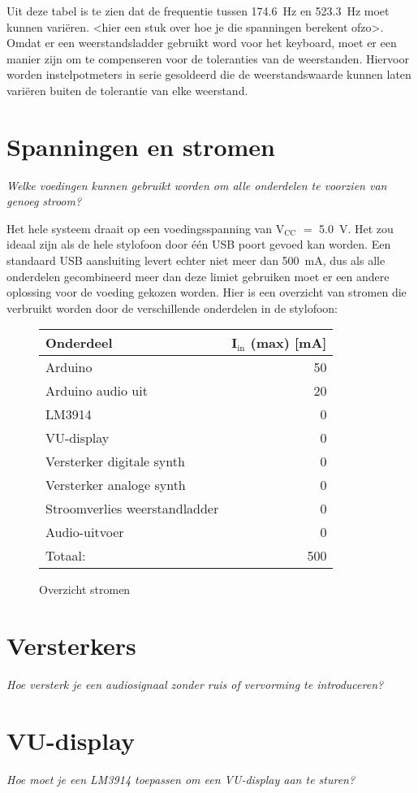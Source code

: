 \documentclass[12pt, a4paper, dutch]{article}
\newcommand{\sub}[1]{$_{\text{#1}}$}
\begin{document}
Uit deze tabel is te zien dat de frequentie tussen \SI{174.6}{\hertz} en
\SI{523.3}{\hertz} moet kunnen vari\"eren. <hier een stuk over hoe je die spanningen
berekent ofzo>. Omdat er een weerstandsladder gebruikt word voor het keyboard, moet
er een manier zijn om te compenseren voor de toleranties van de weerstanden. Hiervoor
worden instelpotmeters in serie gesoldeerd die de weerstandswaarde kunnen laten
vari\"eren buiten de tolerantie van elke weerstand.

\section{Spanningen en stromen}

\textit{Welke voedingen kunnen gebruikt worden om alle onderdelen te voorzien van
genoeg stroom?}

Het hele systeem draait op een voedingsspanning van V\sub{CC} $=$ \SI{5.0}{\volt}.
Het zou ideaal zijn als de hele stylofoon door \'e\'en USB poort gevoed kan worden.
Een standaard USB aansluiting levert echter niet meer dan \SI{500}{\milli\ampere},
dus als alle onderdelen gecombineerd meer dan deze limiet gebruiken moet er een
andere oplossing voor de voeding gekozen worden. Hier is een overzicht van stromen
die verbruikt worden door de verschillende onderdelen in de stylofoon:

\begin{figure}[H]
\centering
\begin{tabular}{lr}
\toprule
Onderdeel & I\sub{in} (max) [\si{\milli\ampere}]\\
\midrule
Arduino & \num{50} \\
Arduino audio uit & \num{20} \\
LM3914 & \num{0} \\
VU-display & \num{0} \\
Versterker digitale synth & \num{0} \\
Versterker analoge synth & \num{0} \\
Stroomverlies weerstandladder & \num{0} \\
Audio-uitvoer & \num{0} \\
\midrule
\hfill Totaal: & \num{500} \\
\bottomrule
\end{tabular}
\caption{Overzicht stromen}
\end{figure}

\section{Versterkers}

\textit{Hoe versterk je een audiosignaal zonder ruis of vervorming te introduceren?}

\section{VU-display}

\textit{Hoe moet je een LM3914 toepassen om een VU-display aan te sturen?}
\end{document}
